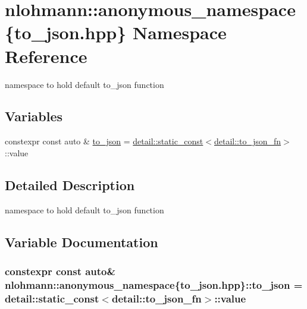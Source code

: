 \hypertarget{namespacenlohmann_1_1anonymous__namespace_02to__json_8hpp_03}{}\section{nlohmann\+:\+:anonymous\+\_\+namespace\{to\+\_\+json.\+hpp\} Namespace Reference}
\label{namespacenlohmann_1_1anonymous__namespace_02to__json_8hpp_03}


namespace to hold default {\ttfamily to\+\_\+json} function  


\subsection*{Variables}
\begin{DoxyCompactItemize}
\item 
constexpr const auto \& \hyperlink{namespacenlohmann_1_1anonymous__namespace_02to__json_8hpp_03_a3cf8d817622a3ecdd3dcce222deb7535}{to\+\_\+json} = \hyperlink{structnlohmann_1_1detail_1_1static__const}{detail\+::static\+\_\+const}$<$\hyperlink{structnlohmann_1_1detail_1_1to__json__fn}{detail\+::to\+\_\+json\+\_\+fn}$>$\+::value
\end{DoxyCompactItemize}


\subsection{Detailed Description}
namespace to hold default {\ttfamily to\+\_\+json} function 

\subsection{Variable Documentation}
\subsubsection[{\texorpdfstring{to\+\_\+json}{to_json}}]{\setlength{\rightskip}{0pt plus 5cm}constexpr const auto\& nlohmann\+::anonymous\+\_\+namespace\{to\+\_\+json.\+hpp\}\+::to\+\_\+json = {\bf detail\+::static\+\_\+const}$<${\bf detail\+::to\+\_\+json\+\_\+fn}$>$\+::value}\hypertarget{namespacenlohmann_1_1anonymous__namespace_02to__json_8hpp_03_a3cf8d817622a3ecdd3dcce222deb7535}{}\label{namespacenlohmann_1_1anonymous__namespace_02to__json_8hpp_03_a3cf8d817622a3ecdd3dcce222deb7535}
